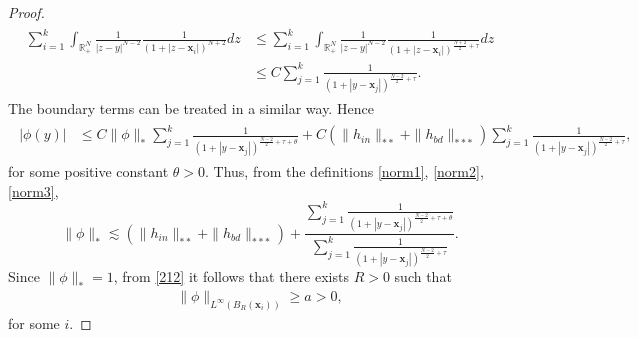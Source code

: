 \documentclass[11pt,a4paper]{amsart}
\begin{document}
\begin{proof}
\begin{align*}
  \begin{aligned}
    \sum_{i=1}^{k} \int_{\mathbb{R}_{+}^{N}} \frac{1}{|z-y|^{N-2}} \frac{1}{\left(1+\left|z-\mathbf{x}_{i}\right|\right)^{N+2}} d z &\leq   \sum_{i=1}^{k} \int_{\mathbb{R}_{+}^{N}} \frac{1}{|z-y|^{N-2}} \frac{1}{\left(1+\left|z-\mathbf{x}_{i}\right|\right)^{\frac{N+2}{2}+\tau}} d z\\
    &\leq C \sum_{j=1}^{k} \frac{1}{\left(1+\left|y-\mathbf{x}_{j}\right|\right)^{\frac{N-2}{2}+\tau}}.
  \end{aligned}
\end{align*}
The boundary terms can be treated in a similar way. Hence
\begin{align*}
  \begin{aligned}
    |\phi(y)| 
    & \leq C \|\phi\|_{*}\sum_{j=1}^{k} \frac{1}{\left(1+\left|y-\mathbf{x}_{j}\right|\right)^{\frac{N-2}{2}+\tau+\theta}}+ C (\|h_{in}\|_{**}+\|h_{bd}\|_{***}) \sum_{j=1}^{k} \frac{1}{\left(1+\left|y-\mathbf{x}_{j}\right|\right)^{\frac{N-2}{2}+\tau}},
  \end{aligned}
\end{align*}
for some positive constant $\theta>0$.
Thus, from the definitions \eqref{norm1}, \eqref{norm2}, \eqref{norm3},
\begin{equation}\label{212}
  \|\phi\|_{*} \lesssim  (\|h_{in}\|_{**}+\|h_{bd}\|_{***}) + \displaystyle\frac{\displaystyle\sum_{j=1}^{k}\frac{1}{\left(1+\left|y-\mathbf{x}_{j}\right|\right)^{\frac{N-2}{2}+\tau+\theta}}}{ \displaystyle\sum_{j=1}^{k} \frac{1}{\left(1+\left|y-\mathbf{x}_{j}\right|\right)^{\frac{N-2}{2}+\tau}}}.
\end{equation}
Since $\|\phi\|_{*}=1$, from \eqref{212} it follows that there exists $R>0$ such that
\begin{align}\label{infty}
  \|\phi\|_{L^{\infty}\left(B_{R}(\mathbf{x}_i)\right)} \geq a>0,
\end{align}
for some $i$.


\end{proof}
\end{document}
